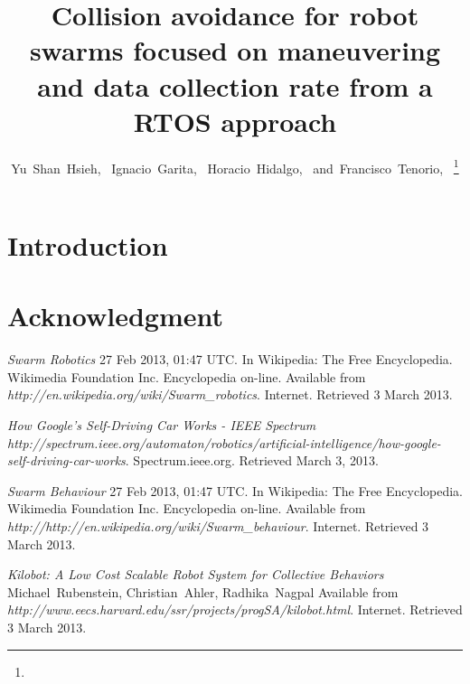 \documentclass[journal]{IEEEtran}
\begin{document}
\title{Collision avoidance for robot swarms focused on maneuvering and data collection rate from a RTOS approach}

\author{Yu~Shan~Hsieh,~
	Ignacio~Garita,~
        Horacio~Hidalgo,~
        and~Francisco~Tenorio,~%
\thanks{}%
%
}

\maketitle

\begin{abstract}

\end{abstract}

\section{Introduction}

\section*{Acknowledgment}

\ifCLASSOPTIONcaptionsoff
  \newpage
\fi
\begin{thebibliography}{1}


\emph{Swarm Robotics} 27 Feb 2013, 01:47 UTC. In Wikipedia: The Free Encyclopedia. Wikimedia Foundation Inc.
Encyclopedia on-line.
Available from \textit{http://en.wikipedia.org/wiki/Swarm\_robotics}. Internet. Retrieved 3 March 2013.

\emph{How Google's Self-Driving Car Works - IEEE Spectrum} \textit{http://spectrum.ieee.org/automaton/robotics/artificial-intelligence/how-google-self-driving-car-works}.
Spectrum.ieee.org. Retrieved March 3, 2013. 


\emph{Swarm Behaviour} 27 Feb 2013, 01:47 UTC. In Wikipedia: The Free Encyclopedia. Wikimedia Foundation Inc.
Encyclopedia on-line.
Available from \textit{http://http://en.wikipedia.org/wiki/Swarm\_behaviour}. Internet. Retrieved 3 March 2013.


\emph{Kilobot: A Low Cost Scalable Robot System for Collective Behaviors} Michael~Rubenstein, Christian~Ahler, Radhika~Nagpal
Available from \textit{http://www.eecs.harvard.edu/ssr/projects/progSA/kilobot.html}. Internet. Retrieved 3 March 2013.


\end{thebibliography}
\end{document}
